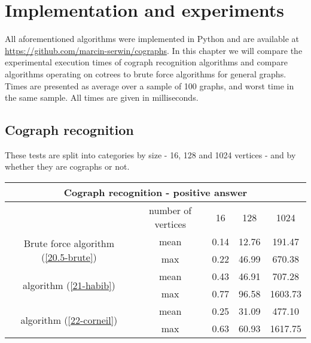 \chapter{Implementation and experiments}
\label{r:experiments}

All aforementioned algorithms were implemented in Python and are available at \url{https://github.com/marcin-serwin/cographs}. In this chapter we will compare the experimental execution times of cograph recognition algorithms and compare algorithms operating on cotrees to brute force algorithms for general graphs. Times are presented as average over a sample of 100 graphs, and worst time in the same sample. All times are given in milliseconds.

\section{Cograph recognition}
These tests are split into categories by size - 16, 128 and 1024 vertices - and by whether they are cographs or not.

\begin{center}

    \begin{tabular}{ |c|c|c|c|c|}
        \hline
        \multicolumn{5}{|c|}{Cograph recognition - positive answer}                                                 \\
        \hline
                                                                      & number of vertices & 16   & 128   & 1024    \\
        \hline
        \multirow{2}{*}{Brute force algorithm (\ref{20.5-brute})}     & mean               & 0.14 & 12.76 & 191.47  \\
                                                                      & max                & 0.22 & 46.99 & 670.38  \\
        \hline
        \multirow{2}{*}{\cite{habib} algorithm (\ref{21-habib})}      & mean               & 0.43 & 46.91 & 707.28  \\
                                                                      & max                & 0.77 & 96.58 & 1603.73 \\
        \hline
        \multirow{2}{*}{\cite{corneil} algorithm (\ref{22-corneil}) } & mean               & 0.25 & 31.09 & 477.10  \\
                                                                      & max                & 0.63 & 60.93 & 1617.75 \\
        \hline
    \end{tabular}
\end{center}

